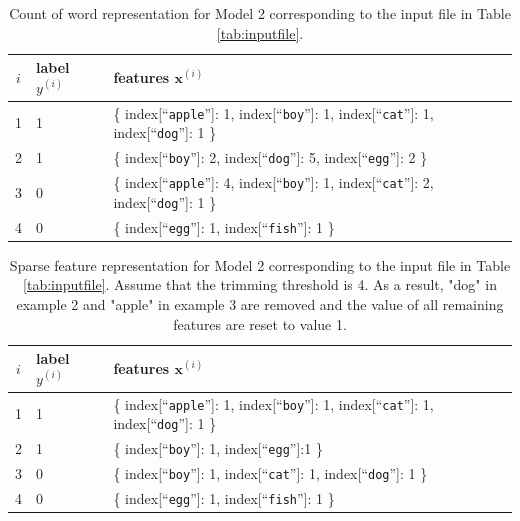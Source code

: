 \documentclass[11pt]{exam}
\numberwithin{equation}{section} %
\numberwithin{figure}{section} %
\numberwithin{table}{section} %
\newcommand{\xv}{\mathbf{x}}
\begin{document}
\begin{table}[p]
    \centering
%
\begin{tabular}{cll}
\toprule
$i$ & {\bf label} $y^{(i)}$ & {\bf features} $\xv^{(i)}$ \\
\midrule
1 & 1 &  \{ index[``{\tt apple}'']: 1, index[``{\tt boy}'']: 1, index[``{\tt cat}'']: 1, index[``{\tt dog}'']: 1 \} \\
2 & 1 & \{ index[``{\tt boy}'']: 2, index[``{\tt dog}'']: 5, index[``{\tt egg}'']: 2 \} \\
3 & 0 & \{ index[``{\tt apple}'']: 4, index[``{\tt boy}'']: 1, index[``{\tt cat}'']: 2, index[``{\tt dog}'']: 1 \} \\
4 & 0 & \{ index[``{\tt egg}'']: 1, index[``{\tt fish}'']: 1 \} \\
\bottomrule
\end{tabular}
%
    \caption{Count of word representation  for Model 2 corresponding to the input file in Table \ref{tab:inputfile}. }
    \label{tab:countofword}
\end{table}

\begin{table}[p]
    \centering
%
\begin{tabular}{cll}
\toprule
$i$ & {\bf label} $y^{(i)}$ & {\bf features} $\xv^{(i)}$ \\
\midrule
1 & 1 &  \{ index[``{\tt apple}'']: 1, index[``{\tt boy}'']: 1, index[``{\tt cat}'']: 1, index[``{\tt dog}'']: 1 \} \\
2 & 1 & \{ index[``{\tt boy}'']: 1,  index[``{\tt egg}'']:1 \} \\
3 & 0 & \{  index[``{\tt boy}'']: 1, index[``{\tt cat}'']: 1, index[``{\tt dog}'']: 1 \} \\
4 & 0 & \{ index[``{\tt egg}'']: 1, index[``{\tt fish}'']: 1 \} \\
\bottomrule
\end{tabular}
%
    \caption{Sparse feature representation for Model 2 corresponding to the input file in Table \ref{tab:inputfile}. Assume that the trimming threshold is 4. As a result, "dog" in example 2 and "apple" in example 3 are removed and the value of all remaining features are reset to value 1.}
    \label{tab:model2sparse}
\end{table}

%
%
\end{document}

